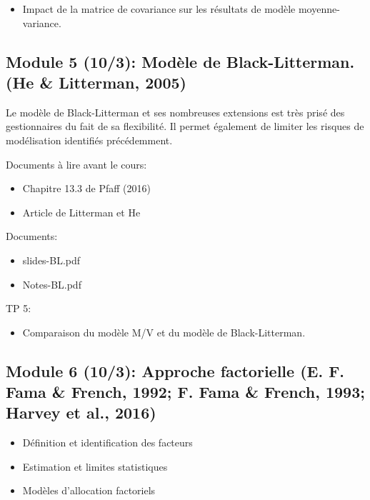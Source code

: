 \documentclass[
  11pt,
]{article}
\providecommand{\tightlist}{%
  \setlength{\itemsep}{0pt}\setlength{\parskip}{0pt}}
\begin{document}
\begin{itemize}
\tightlist
\item
  Impact de la matrice de covariance sur les résultats de modèle
  moyenne-variance.
\end{itemize}

\hypertarget{module-5-103-moduxe8le-de-black-litterman.-he2005}{%
\subsection{Module 5 (10/3): Modèle de Black-Litterman. (He \&
Litterman,
2005)}\label{module-5-103-moduxe8le-de-black-litterman.-he2005}}

Le modèle de Black-Litterman et ses nombreuses extensions est très prisé
des gestionnaires du fait de sa flexibilité. Il permet également de
limiter les risques de modélisation identifiés précédemment.

Documents à lire avant le cours:

\begin{itemize}
\tightlist
\item
  Chapitre 13.3 de Pfaff (2016)
\item
  Article de Litterman et He
\end{itemize}

Documents:

\begin{itemize}
\tightlist
\item
  slides-BL.pdf
\item
  Notes-BL.pdf
\end{itemize}

TP 5:

\begin{itemize}
\tightlist
\item
  Comparaison du modèle M/V et du modèle de Black-Litterman.
\end{itemize}

\hypertarget{module-6-103-approche-factorielle-fama1992-fama1993-harvey2016a}{%
\subsection{Module 6 (10/3): Approche factorielle (E. F. Fama \& French,
1992; F. Fama \& French, 1993; Harvey et al.,
2016)}\label{module-6-103-approche-factorielle-fama1992-fama1993-harvey2016a}}

\begin{itemize}
\tightlist
\item
  Définition et identification des facteurs
\item
  Estimation et limites statistiques
\item
  Modèles d'allocation factoriels
\end{itemize}
\end{document}
